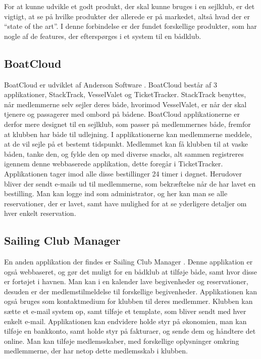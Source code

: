 For at kunne udvikle et godt produkt, der skal kunne bruges i en sejlklub, er det vigtigt, at se på hvilke produkter der allerede er på markedet, altså hvad der er ``state of the art''. 
I denne forbindelse er der fundet forskellige produkter, som har nogle af de features, der efterspørges i et system til en bådklub.


\subsection*{BoatCloud}

BoatCloud er udviklet af Anderson Software \citep{BoatCloud}.
BoatCloud består af 3 applikationer, StackTrack, VesselValet og TicketTracker.
StackTrack benyttes, når medlemmerne selv sejler deres både, hvorimod VesselValet, er når der skal tjenere og passagerer med ombord på bådene. 
BoatCloud applikationerne er derfor mere designet til en sejlklub, som passer på medlemmernes både, fremfor at klubben har både til udlejning. 
I applikationerne kan medlemmerne meddele, at de vil sejle på et bestemt tidspunkt. 
Medlemmet kan få klubben til at vaske båden, tanke den, og fylde den op med diverse snacks, alt sammen registreres igennem denne webbaserede applikation, dette foregår i TicketTracker. 
Applikationen tager imod alle disse bestillinger 24 timer i døgnet. 
Herudover bliver der sendt e-mails ud til medlemmerne, som bekræftelse når de har lavet en bestilling.
Man kan logge ind som administrator, og her kan man se alle reservationer, der er lavet, samt have mulighed for at se yderligere detaljer om hver enkelt reservation.


\subsection*{Sailing Club Manager}

En anden applikation der findes er Sailing Club Manager \citep{SailClub}. 
Denne applikation er også webbaseret, og gør det muligt for en bådklub at tilføje både, samt hvor disse er fortøjet i havnen. 
Man kan i en kalender lave begivenheder og reservationer, desuden er der medlemstilmeldelse til forskellige begivenheder. Applikationen kan også bruges som kontaktmedium for klubben til deres medlemmer. 
Klubben kan sætte et e-mail system op, samt tilføje et template, som bliver sendt med hver enkelt e-mail.
Applikationen kan endvidere holde styr på økonomien, man kan tilføje en bankkonto, samt holde styr på fakturaer, og sende dem og håndtere det online. 
Man kan tilføje medlemsskaber, med forskellige oplysninger omkring medlemmerne, der har netop dette medlemsskab i klubben.

